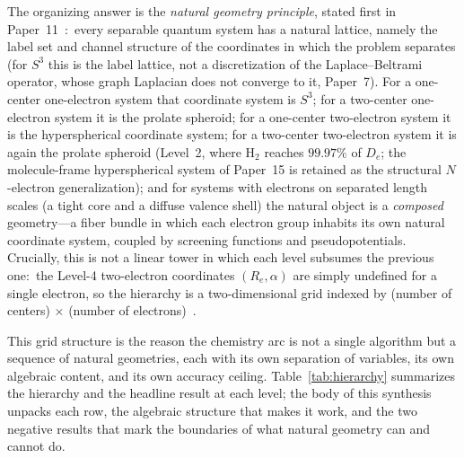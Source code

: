 \documentclass[aps,pra,twocolumn,superscriptaddress,longbibliography]{revtex4-2}
\newcommand{\gvc}[2]{#2}
\begin{document}
The organizing answer is the \emph{natural geometry principle}, stated
first in Paper~11~\cite{loutey_paper11}:\ every separable quantum
system has a natural lattice, namely the label set and channel
structure of the coordinates in which the problem separates (for $S^3$
this is the label lattice, \gvc{graph-s3-wall}{not a discretization of the
Laplace--Beltrami operator, whose graph Laplacian does not converge to
it, Paper~7}).  For a one-center one-electron system that coordinate system
is $S^3$; for a two-center one-electron system it is the prolate
spheroid; for a one-center two-electron system it is the hyperspherical
coordinate system; for a two-center two-electron system it is again
the prolate spheroid (Level~2, where H$_2$ reaches $99.97\%$ of $D_e$;
the molecule-frame hyperspherical system of Paper~15 is retained as the
structural $N$-electron generalization); and for systems with electrons on
separated length scales (a tight core and a diffuse valence shell) the
natural object is a \emph{composed} geometry---a fiber bundle in which
each electron group inhabits its own natural coordinate system, coupled
by screening functions and pseudopotentials.  Crucially, this is not a
linear tower in which each level subsumes the previous one:\ the
Level-4 two-electron coordinates $(R_e, \alpha)$ are simply undefined
for a single electron, so the hierarchy is a two-dimensional grid
indexed by (number of centers) $\times$ (number of
electrons)~\cite{loutey_paper17}.

This grid structure is the reason the chemistry arc is not a single
algorithm but a sequence of natural geometries, each with its own
separation of variables, its own algebraic content, and its own
accuracy ceiling.  Table~\ref{tab:hierarchy} summarizes the hierarchy
and the headline result at each level; the body of this synthesis
unpacks each row, the algebraic structure that makes it work, and the
two negative results that mark the boundaries of what natural geometry
can and cannot do.
\end{document}

